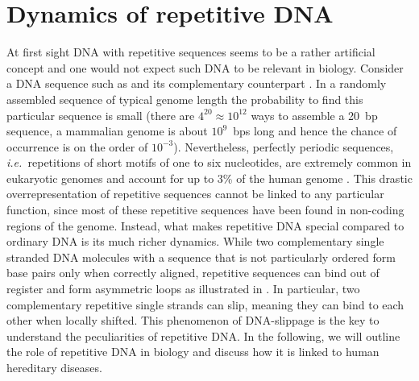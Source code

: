 \chapter{Dynamics of repetitive DNA}
\label{sec:DNA_sliding}
At first sight DNA with repetitive sequences seems to be a rather artificial concept and 
one would not expect such DNA to be relevant in biology.  
Consider a DNA sequence such as  and its complementary
counterpart . In a randomly assembled sequence of typical genome length 
the probability to find this particular sequence
is small (there are $4^{20}\approx10^{12}$ ways to assemble
a 20~bp sequence, a mammalian genome is about $10^9$~bps long and hence the chance of occurrence is on the order of $10^{-3}$).
Nevertheless, perfectly periodic sequences, \emph{i.e.~}repetitions of short motifs of one to six nucleotides, 
are extremely common in eukaryotic genomes \cite{Ellegren_NRG_04} 
and account for up to 3\% of the human genome \cite{HumanGenome_Nature_01}.
This drastic overrepresentation of repetitive sequences cannot be
linked to any particular function, since 
most of these repetitive sequences have been found in non-coding regions of the
genome. Instead, what makes repetitive DNA
special compared to ordinary DNA is its much richer dynamics. While two complementary
single stranded DNA molecules with a sequence that is not particularly ordered form base pairs
only when correctly aligned, repetitive sequences can bind out of register and form
asymmetric loops as illustrated in . In particular, two complementary
repetitive single strands can slip, meaning they can bind to each other when locally shifted. 
This phenomenon of DNA-slippage is the key to understand the peculiarities of repetitive DNA.
In the following, we will outline the role of repetitive DNA in biology and discuss how it is linked
to human hereditary diseases. 

